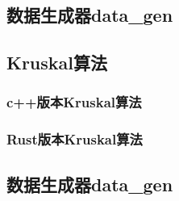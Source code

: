 \subsection{数据生成器data\_gen}


\subsection{Kruskal算法}
\subsubsection{c++版本Kruskal算法}

\subsubsection{Rust版本Kruskal算法}

\subsection{数据生成器data\_gen}

